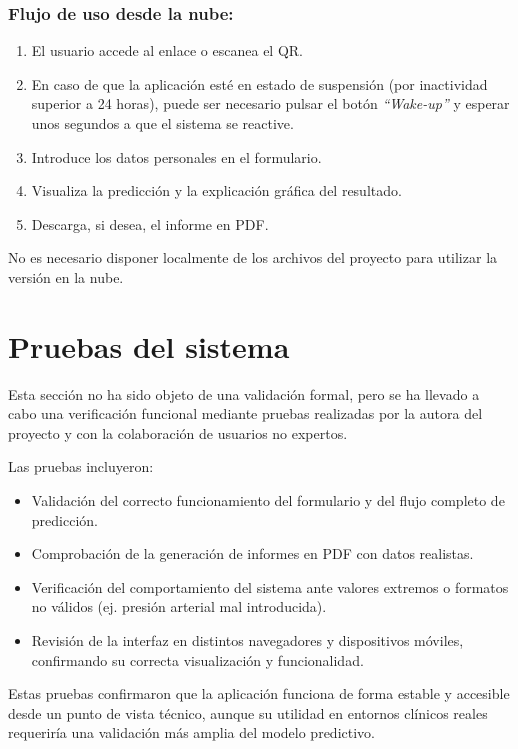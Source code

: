 \subsubsection{Flujo de uso desde la nube:}
\begin{enumerate}
    \item El usuario accede al enlace o escanea el QR.
    \item En caso de que la aplicación esté en estado de suspensión (por inactividad superior a 24 horas), puede ser necesario pulsar el botón \textit{“Wake-up”} y esperar unos segundos a que el sistema se reactive.
    \item Introduce los datos personales en el formulario.
    \item Visualiza la predicción y la explicación gráfica del resultado.
    \item Descarga, si desea, el informe en PDF.
\end{enumerate}

No es necesario disponer localmente de los archivos del proyecto para utilizar la versión en la nube.


\section{Pruebas del sistema}

Esta sección no ha sido objeto de una validación formal, pero se ha llevado a cabo una verificación funcional mediante pruebas realizadas por la autora del proyecto y con la colaboración de usuarios no expertos.

Las pruebas incluyeron:

\begin{itemize}
    \item Validación del correcto funcionamiento del formulario y del flujo completo de predicción.
    \item Comprobación de la generación de informes en PDF con datos realistas.
    \item Verificación del comportamiento del sistema ante valores extremos o formatos no válidos (ej. presión arterial mal introducida).
    \item Revisión de la interfaz en distintos navegadores y dispositivos móviles, confirmando su correcta visualización y funcionalidad.
\end{itemize}

Estas pruebas confirmaron que la aplicación funciona de forma estable y accesible desde un punto de vista técnico, aunque su utilidad en entornos clínicos reales requeriría una validación más amplia del modelo predictivo.




